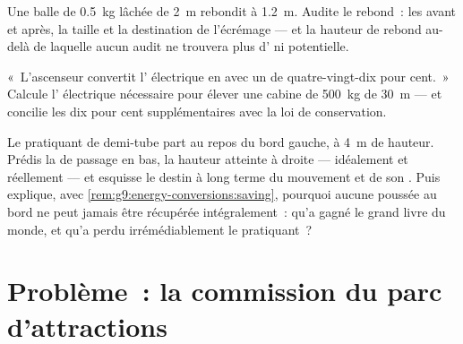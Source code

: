 \begin{exercise}[$\star\star$]\label{exo:g9:energy-conversions:10}
Une balle de \qty{0.5}{kg} lâchée de \qty{2}{m} rebondit à
\qty{1.2}{m}. Audite le rebond~: les  avant et après, la
taille et la destination de l'écrémage --- et la hauteur de rebond
au-delà de laquelle aucun audit ne trouvera plus d'
ni potentielle.
\end{exercise}

\begin{exercise}[$\star\star$]\label{exo:g9:energy-conversions:11}
«~L'ascenseur convertit l' électrique en 
avec un  de quatre-vingt-dix pour cent.~» Calcule l'
électrique nécessaire pour élever une cabine de \qty{500}{kg} de
\qty{30}{m} --- et concilie les dix pour cent supplémentaires avec la
loi de conservation.
\end{exercise}

\begin{exercise}[$\star\star\star$]\label{exo:g9:energy-conversions:12}
Le pratiquant de demi-tube part au repos du bord gauche, à
\qty{4}{m} de hauteur. Prédis la  de passage en bas, la
hauteur atteinte à droite --- idéalement et réellement --- et esquisse
le destin à long terme du mouvement et de son . Puis explique,
avec \cref{rem:g9:energy-conversions:saving}, pourquoi aucune poussée
au bord ne peut jamais être récupérée intégralement~: qu'a gagné le
grand livre du monde, et qu'a perdu irrémédiablement le
pratiquant~?
\end{exercise}

\section{Problème~: la commission du parc d'attractions}

